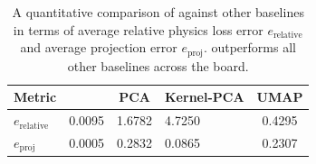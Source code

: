 \documentclass[letterpaper]{article} %
\begin{document}


          


            \begin{table}
            \centering
            \begin{tabular}{|p{1cm}|p{1.5cm}|c|p{1cm}|c|}
            \hline
            \textbf{Metric} & \proposedautencoder{}& PCA & Kernel-PCA & UMAP   \\
            \hline
            \textbf{$e_{\text{relative}}$} & 0.0095 & 1.6782  & 4.7250 & 0.4295\\
            \hline
            \textbf{$e_{\text{proj}}$} & 0.0005 &  0.2832 & 0.0865 & 0.2307 \\
            \hline
            \end{tabular}
            \caption{A quantitative comparison of \proposedautencoder{} against other baselines in terms of average relative physics loss error \textbf{$e_{\text{relative}}$} and average projection error \textbf{$e_{\text{proj}}$}. \proposedautencoder{} outperforms all other baselines across the board.}
            \label{tab:quant_losslandscape}
            \end{table}
\end{document}
